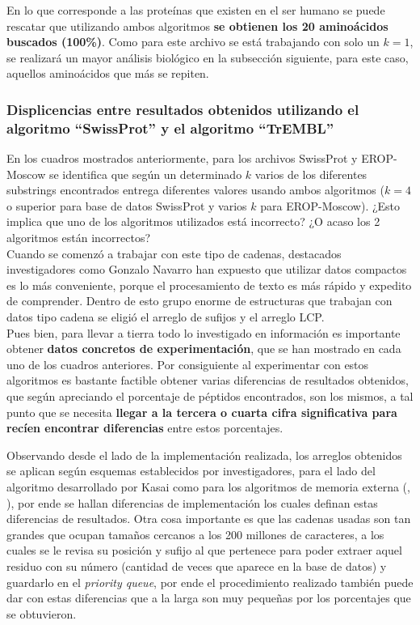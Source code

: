 En lo que corresponde a las proteínas que existen en el ser humano se puede rescatar que utilizando ambos algoritmos \textbf{se obtienen los 20 aminoácidos buscados (100\%)}. Como para este archivo se está trabajando con solo un $k=1$, se realizará un mayor análisis biológico en la subsección siguiente, para este caso, aquellos aminoácidos que más se repiten.

\subsubsection{Displicencias entre resultados obtenidos utilizando el algoritmo ``SwissProt'' y el algoritmo ``TrEMBL''}

En los cuadros mostrados anteriormente, para los archivos SwissProt y EROP-Moscow se identifica que según un determinado $k$ varios de los diferentes substrings encontrados entrega diferentes valores usando ambos algoritmos ($k=4$ o superior para base de datos SwissProt y varios $k$ para EROP-Moscow). ¿Esto implica que uno de los algoritmos utilizados está incorrecto? ¿O acaso los 2 algoritmos están incorrectos?\\
Cuando se comenzó a trabajar con este tipo de cadenas, destacados investigadores como Gonzalo Navarro \cite{navarro2016} han expuesto que utilizar datos compactos es lo más conveniente, porque el procesamiento de texto es más rápido y expedito de comprender. Dentro de esto grupo enorme de estructuras que trabajan con datos tipo cadena se eligió el arreglo de sufijos y el arreglo LCP.\\
Pues bien, para llevar a tierra todo lo investigado en información es importante obtener \textbf{datos concretos de experimentación}, que se han mostrado en cada uno de los cuadros anteriores. Por consiguiente al experimentar con estos algoritmos es bastante factible obtener varias diferencias de resultados obtenidos, que según apreciando el porcentaje de péptidos encontrados, son los mismos, a tal punto que se necesita \textbf{llegar a la tercera o cuarta cifra significativa para recíen encontrar diferencias} entre estos porcentajes.

Observando desde el lado de la implementación realizada, los arreglos obtenidos se aplican según esquemas establecidos por investigadores, para el lado del algoritmo desarrollado por Kasai \cite{kasai} como para los algoritmos de memoria externa (\cite{sascan}, \cite{emsparse}), por ende se hallan diferencias de implementación los cuales definan estas diferencias de resultados. Otra cosa importante es que las cadenas usadas son tan grandes que ocupan tamaños cercanos a los 200 millones de caracteres, a los cuales se le revisa su posición y sufijo al que pertenece para poder extraer aquel residuo con su número (cantidad de veces que aparece en la base de datos) y guardarlo en el \textit{priority queue}, por ende el procedimiento realizado también puede dar con estas diferencias que a la larga son muy pequeñas por los porcentajes que se obtuvieron.

